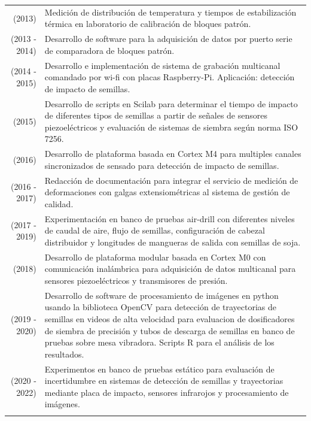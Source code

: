 \documentclass[a4paper,10pt, sans]{article}
\begin{document}
\begin{table}[h!]
\begin{tabularx}{\textwidth}{r X}
        (2013) & Medición de distribución de temperatura y tiempos de estabilización térmica en laboratorio de calibración de bloques patrón. \\ [1ex]
        (2013 - 2014) & Desarrollo de software para la adquisición de datos por puerto serie de comparadora de bloques patrón. \\ [1ex]
        (2014 - 2015) & Desarrollo e implementación de sistema de grabación multicanal comandado por wi-fi con placas Raspberry-Pi. Aplicación: detección de impacto de semillas. \\ [1ex]
        (2015) & Desarrollo de scripts en Scilab para determinar el tiempo de impacto de diferentes tipos de semillas a partir de señales de sensores piezoeléctricos y evaluación de sistemas de siembra según norma ISO 7256. \\ [1ex]
        (2016) & Desarrollo de plataforma basada en Cortex M4 para multiples canales sincronizados de sensado para detección de impacto de semillas. \\ [1ex]
        (2016 - 2017) & Redacción de documentación para integrar el servicio de medición de deformaciones con galgas extensiométricas al sistema de gestión de calidad. \\ [1ex]
        (2017 - 2019) & Experimentación en banco de pruebas air-drill con diferentes niveles de caudal de aire, flujo de semillas, configuración de cabezal distribuidor y longitudes de mangueras de salida con semillas de soja. \\ [1ex]
        (2018) & Desarrollo de plataforma modular basada en Cortex M0 con comunicación inalámbrica para adquisición de datos multicanal para sensores piezoeléctricos y transmisores de presión. \\ [1ex]
        (2019 - 2020) & Desarrollo de software de procesamiento de imágenes en python usando la biblioteca OpenCV para detección de trayectorias de semillas en videos de alta velocidad para evaluacion de dosificadores de siembra de precisión y tubos de descarga de semillas en banco de pruebas sobre mesa vibradora. Scripts R para el análisis de los resultados. \\ [1ex]
        (2020 - 2022) & Experimentos en banco de pruebas estático para evaluación de incertidumbre en sistemas de detección de semillas y trayectorias mediante placa de impacto, sensores infrarojos y procesamiento de imágenes. \\ \\
  \end{tabularx}
  \end{table}
  
\end{document}
